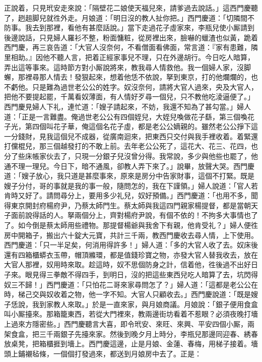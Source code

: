 正說着，只見玳安走來說：「隔壁花二娘使天福兒來，請爹過去說話。」這西門慶聽了，趔趄脚兒就徃外走。月娘道：「明日沒的教人扯你把。」西門慶道：「切隣間不防事。我去到那裡，看他有甚麼話說。」當下走過花子虛家來，李瓶兒使小厮請到後邊說話，只見婦人羅衫不整，粉面慵粧，從房裡出來，臉嚇的蠟渣也似黃，跪着西門慶，再三哀告道：「大官人沒奈何，不看僧面看佛面，{}常言道：『家有患難，隣里相助。』因他不聽人言，把着正經家事兒不理，只在外邊胡行。今日吃人暗算，弄出這等事來。這時節方對小厮說將來，教我尋人情救他。我一個婦人家，沒脚蠏，那裡尋那人情去！發狠起來，想着他恁不依說，拏到東京，打的他爛爛的，也不虧他。{}只是難為過世老公公的姓字。奴沒奈何，請將大官人過來，央及大官人，把他不要提起罷，千萬看奴薄面，有人情好歹尋一個兒，只不教他吃淩逼便了。」西門慶見婦人下礼，連忙道：「嫂子請起來，不妨，我還不知為了甚勾當。」婦人道：「正是一言難盡。俺過世老公公有四個姪兒，大姪兒喚做花子繇，第三個喚花子光，第四個叫花子華，俺這個名花子虛，都是老公公嫡親的。雖然老公公掙下這一分錢財，見我這個兒不成器，從廣南迴來，把東西只交付與我手裡收着。着緊還打儻棍兒，那三個越發打的不敢上前。去年老公公死了，這花大、花三、花四，也分了些床帳家伙去了，只現一分銀子兒沒曾分得。我常說，多少與他些也罷了，他通不理一理兒。今日下，暗不通風，卻教人弄下來了。」說畢，放聲大哭。西門慶道：「嫂子放心，我只道是甚麼事來，原來是房分中告家財事，這個不打緊。既是嫂子分付，哥的事就是我的事一般，隨問怎的，我在下謹領。」婦人說道：「官人若肯時又好了。請問尋分上，要用多少礼兒，奴好預備。」西門慶道：「也用不多，聞得東京開封府楊府尹，乃蔡太師門生。蔡太師與我這四門親家楊提督，都是當朝天子面前說得話的人。拏兩個分上，齊對楊府尹說，有個不依的！不拘多大事情也了了。如今倒是蔡太師用些禮物。那提督楊爺與我舍下有親，他肯受礼？」婦人便徃房中開箱子，搬出六十錠大元寶，共計三千兩，教西門慶收去尋人情，上下使用。西門慶道：「只一半足矣，何消用得許多！」婦人道：「多的大官人收了去。奴床後還有四箱櫃蟒衣玉帶，帽頂縧環，都是值錢珍寶之物，亦發大官人替我收去，放在大官人那裡，奴用時來取。{}趁這時，奴不思個防身之計，信着他，徃後過不出好日子來。眼見得三拳敵不得四手，到明日，沒的把這些東西兒吃人暗算了去，坑閃得奴三不歸！」西門慶道：「只怕花二哥來家尋問怎了？」婦人道：「這都是老公公在時，梯己交與奴收着之物，他一字不知。大官人只顧收去。」西門慶說道：「既是嫂子恁說，我到家教人來取。」於是一直來家，與月娘商議。月娘說：「銀子便用食盒叫小厮擡來。那箱籠東西，若從大門裡來，教兩邊街坊看着不惹眼？必須夜晚打墻上過來方隱密些。」西門慶聽言大喜，即令玳安、來旺、來興、平安四個小厮，兩架食盒，把三千兩銀子先擡來家。然後到晚夕月上時分，李瓶兒那邊同迎春、綉春放桌凳，把箱櫃捱到墻上。西門慶這邊，止是月娘、金蓮、春梅，用梯子接着。墻頭上鋪襯毡條，一個個打發過來，都送到月娘房中去了。正是：

